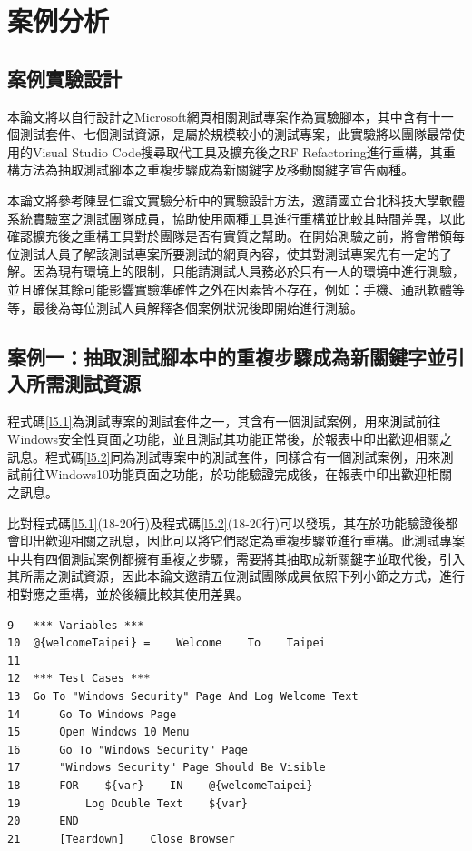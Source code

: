 \chapter{案例分析}
\section{案例實驗設計}
\indent
本論文將以自行設計之Microsoft網頁相關測試專案作為實驗腳本，其中含有十一個測試套件、七個測試資源，是屬於規模較小的測試專案，此實驗將以團隊最常使用的Visual Studio Code搜尋取代工具及擴充後之RF Refactoring進行重構，其重構方法為抽取測試腳本之重複步驟成為新關鍵字及移動關鍵字宣告兩種。

\indent
本論文將參考陳昱仁論文\cite{Experiment_Settings}實驗分析中的實驗設計方法，邀請國立台北科技大學軟體系統實驗室之測試團隊成員，協助使用兩種工具進行重構並比較其時間差異，以此確認擴充後之重構工具對於團隊是否有實質之幫助。在開始測驗之前，將會帶領每位測試人員了解該測試專案所要測試的網頁內容，使其對測試專案先有一定的了解。因為現有環境上的限制，只能請測試人員務必於只有一人的環境中進行測驗，並且確保其餘可能影響實驗準確性之外在因素皆不存在，例如：手機、通訊軟體等等，最後為每位測試人員解釋各個案例狀況後即開始進行測驗。

\section{案例一：抽取測試腳本中的重複步驟成為新關鍵字並引入所需測試資源}\label{s5.1}
\indent
程式碼\ref{l5.1}為測試專案的測試套件之一，其含有一個測試案例，用來測試前往Windows安全性頁面之功能，並且測試其功能正常後，於報表中印出歡迎相關之訊息。程式碼\ref{l5.2}同為測試專案中的測試套件，同樣含有一個測試案例，用來測試前往Windows10功能頁面之功能，於功能驗證完成後，在報表中印出歡迎相關之訊息。

\indent
比對程式碼\ref{l5.1}(18-20行)及程式碼\ref{l5.2}(18-20行)可以發現，其在於功能驗證後都會印出歡迎相關之訊息，因此可以將它們認定為重複步驟並進行重構。此測試專案中共有四個測試案例都擁有重複之步驟，需要將其抽取成新關鍵字並取代後，引入其所需之測試資源，因此本論文邀請五位測試團隊成員依照下列小節之方式，進行相對應之重構，並於後續比較其使用差異。

\begin{lstlisting}[caption=前往Windows安全性頁面之測試套件, label={l5.1}]
9   *** Variables ***
10  @{welcomeTaipei} =    Welcome    To    Taipei
11  
12  *** Test Cases ***
13  Go To "Windows Security" Page And Log Welcome Text
14      Go To Windows Page
15      Open Windows 10 Menu
16      Go To "Windows Security" Page
17      "Windows Security" Page Should Be Visible
18      FOR    ${var}    IN    @{welcomeTaipei}
19          Log Double Text    ${var}
20      END
21      [Teardown]    Close Browser
\end{lstlisting}

